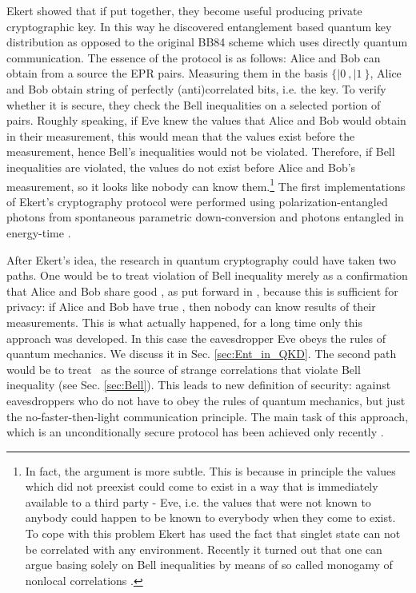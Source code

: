 \documentclass[rmp,12pt,preprint]{revtex4-2}
\begin{document}
Ekert showed that if put together, they become useful producing
private cryptographic key. In this way he discovered entanglement
based quantum key distribution as opposed to the original BB84 scheme
which uses directly quantum communication.  The essence of the
protocol is as follows: Alice and Bob can obtain from a source the EPR
pairs.  Measuring them in the basis $\{|0\>,|1\>\}$, Alice and Bob obtain
string of perfectly (anti)correlated bits, i.e. the key. To verify
whether it is secure, they check the Bell inequalities on a selected portion
of pairs.  Roughly speaking, if Eve knew the values that Alice and Bob
would obtain in their measurement, this would mean that the values exist before
the measurement, hence Bell's inequalities would not be
violated. Therefore, if Bell inequalities are violated, the values do
not exist before Alice and Bob's measurement, so it looks like nobody
can know them.\footnote{ In fact, the argument is more subtle. This is
  because in principle the values which did not preexist could come to
  exist in a way that is immediately available to a third party - Eve,
  i.e. the values that were not known to anybody could happen to be
  known to everybody when they come to exist.  To cope with this
  problem Ekert has used the fact that singlet state can not be
  correlated with any environment. Recently it turned out that one can
  argue basing solely on Bell inequalities by means of so called
  monogamy of nonlocal correlations
  \cite{AcinGM-bellqkd,BKP_Bellcrypto,BHK_Bell_key,MW_Bellcrypto}.}
 The first implementations of Ekert’s cryptography protocol were performed 
 using polarization-entangled photons from spontaneous parametric down-conversion 
 \cite {NaikPWBK} and photons entangled in energy-time \cite {TittelBZG}.


After Ekert's idea, the research in quantum cryptography could have
taken two paths. One would be to treat violation of Bell inequality merely
as a confirmation that Alice and Bob share good \eprstates, as put
forward in \cite{BBM92}, because this is sufficient for privacy: if
Alice and Bob have true \eprstate, then nobody can know results of
their measurements. This is what actually happened, for a long time
only this approach was developed. In this case the eavesdropper Eve
obeys the rules of quantum mechanics. We discuss it in
Sec. \ref{sec:Ent_in_QKD}.  The second path would be to treat \eprstate\ as
the source of strange correlations that violate Bell inequality (see
Sec. \ref{sec:Bell}). This leads to new definition of security:
against eavesdroppers who do not have to obey the rules of quantum
mechanics, but just the no-faster-then-light communication
principle. The main task of this approach, which is an unconditionally
secure protocol has been achieved only recently
\cite{Nonsig_theories,BHK_Bell_key,MW_Bellcrypto}.
\end{document}
